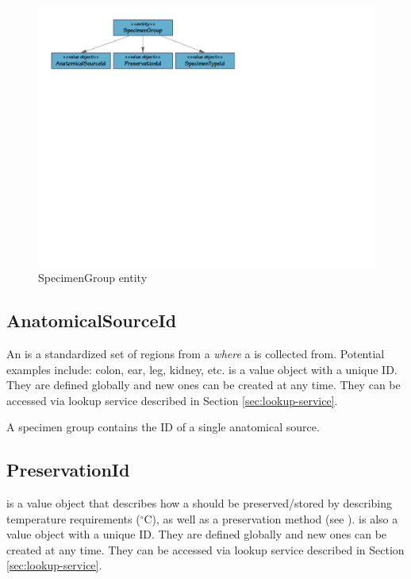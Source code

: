 \begin{figure}[h]
  \centering
  \includegraphics[trim={9mm 162mm 80mm 9mm}, clip,
    width=1\textwidth]{images/specimen-group}
  \caption{SpecimenGroup entity}
  \label{fig:specimen-group}
\end{figure}

\subsection*{AnatomicalSourceId}

An  is a standardized set of regions from a
 \emph{where} a  is collected
from. Potential examples include: colon, ear, leg, kidney,
etc.  is a value object with a unique ID. They are
defined globally and new ones can be created at any time. They can be accessed
via lookup service described in Section \ref{sec:lookup-service}.

A specimen group contains the ID of a single anatomical source.

\subsection*{PreservationId}

 is a value object that describes how a
 should be preserved/stored by describing temperature
requirements ($^\circ$C), as well as a preservation method (see
).  is also a value
object with a unique ID. They are defined globally and new ones can be created
at any time. They can be accessed via lookup service described in Section
\ref{sec:lookup-service}.

